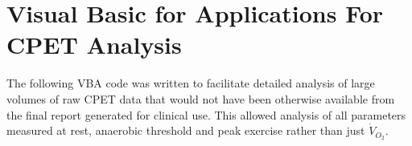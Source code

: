 \chapter{Visual Basic for Applications For CPET Analysis} %
\label{AppendixExcelMacros} %
\clearpage

The following VBA code was written to facilitate detailed analysis of large volumes of raw CPET data that would not have been otherwise available from the final report generated for clinical use. This allowed analysis of all parameters measured at rest, anaerobic threshold and peak exercise rather than just $\dot{V}_{O_2}$.

